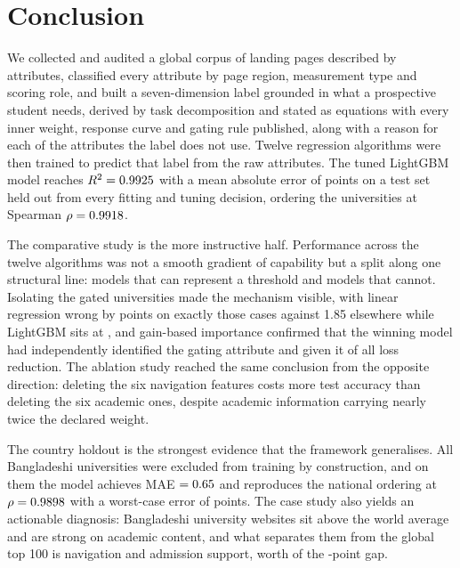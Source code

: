 \documentclass[11pt,a4paper]{article}
\begin{document}
\section{Conclusion}

We collected and audited a global corpus of \nUni{} landing pages described by \nFeat{} attributes,
classified every attribute by page region, measurement type and scoring role, and built a
seven-dimension label grounded in what a prospective student needs, derived by task decomposition and
stated as equations with every inner weight, response curve and gating rule published, along with a
reason for each of the \nUnscored{} attributes the label does not use. Twelve regression algorithms
were then trained to predict that label from the raw attributes. The tuned LightGBM model reaches
$R^2 = 0.9925{}$ with a mean absolute error of \tMAE{} points on a test set held out from every fitting
and tuning decision, ordering the universities at Spearman $\rho = 0.9918{}$.

The comparative study is the more instructive half. Performance across the twelve algorithms was not a
smooth gradient of capability but a split along one structural line: models that can represent a
threshold and models that cannot. Isolating the \nGatedTest{} gated universities made the mechanism
visible, with linear regression wrong by \linGated{} points on exactly those cases against 1.85
elsewhere while LightGBM sits at \lgbGated{}, and gain-based importance confirmed that the winning
model had independently identified the gating attribute and given it \impNav{} of all loss reduction.
The ablation study reached the same conclusion from the opposite direction: deleting the six
navigation features costs more test accuracy than deleting the six academic ones, despite academic
information carrying nearly twice the declared weight.

The country holdout is the strongest evidence that the framework generalises. All \nBD{} Bangladeshi
universities were excluded from training by construction, and on them the model achieves MAE
$= 0.65{}$ and reproduces the national ordering at $\rho = 0.9898{}$ with a worst-case error of
\bdMaxErr{} points. The case study also yields an actionable diagnosis: Bangladeshi university
websites sit above the world average and are strong on academic content, and what separates them from
the global top 100 is navigation and admission support, worth \bdGapNavAdm{} of the
\bdGapTop{}-point gap.
\end{document}
